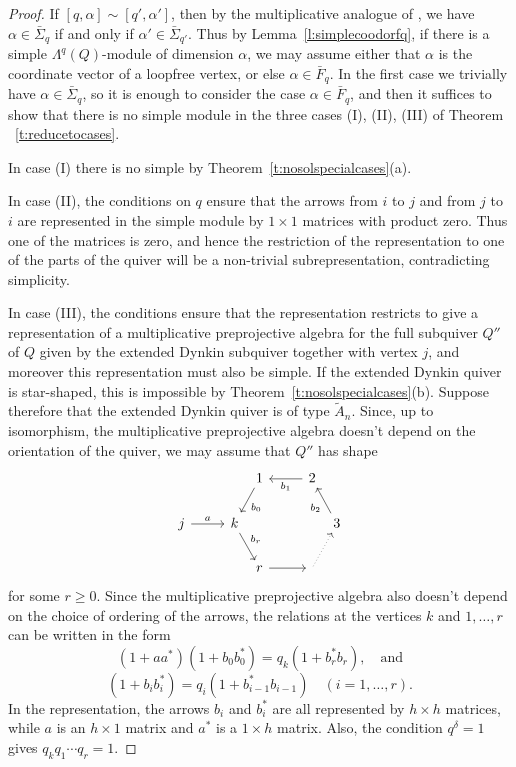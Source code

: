 \documentclass[12pt,a4paper]{amsart}
\theoremstyle{plain}
\begin{document}
\begin{proof}
If $[q,\alpha]\sim[q',\alpha']$, then by the multiplicative analogue of \cite[Lemma 5.2(3)]{CBmm}, we have $\alpha\in\bar\Sigma_q$ if and only if $\alpha'\in\bar\Sigma_{q'}$. Thus by 
Lemma~\ref{l:simplecoodorfq}, if there is a simple $\Lambda^q(Q)$-module of dimension $\alpha$, we may assume either that $\alpha$ is the coordinate vector of a loopfree vertex, or else $\alpha\in\bar F_q$. In the first case we trivially have $\alpha\in\bar\Sigma_q$, so it is enough to consider the case $\alpha\in\bar F_q$, and then it suffices to show that there is no simple module in the three cases (I), (II), (III) of Theorem ~\ref{t:reducetocases}.

In case (I) there is no simple by Theorem~\ref{t:nosolspecialcases}(a).

In case (II), the conditions on $q$ ensure that the arrows from $i$ to $j$ and from $j$ to $i$ 
are represented in the simple module by $1\times 1$ matrices with product zero. Thus one of the matrices is zero, and hence the restriction of the representation to one of the parts of the quiver will be a non-trivial subrepresentation, contradicting simplicity.

In case (III), the conditions ensure that the representation restricts to give a representation of a multiplicative preprojective algebra for the full subquiver $Q''$ of $Q$ given by the extended Dynkin subquiver together with vertex $j$, and moreover this representation must also be simple. If the extended Dynkin quiver is star-shaped, this is impossible by Theorem~\ref{t:nosolspecialcases}(b). Suppose therefore that the extended Dynkin quiver is of type $\tilde{A}_n$. Since, up to isomorphism, the multiplicative preprojective algebra doesn't depend on the orientation of the quiver, we may assume that $Q''$ has shape
\[ \begin{tikzcd}
&&[-20pt] 1 \arrow[dl,"b_0"] & 2 \arrow[l,"b_1"]\\
j \arrow[r,"a"] & k \arrow[dr,"b_r"] &&&[-20pt] 3 \arrow[ul,"b_2"]\\
&& r \arrow[r] & {} \arrow[ur,dotted]
\end{tikzcd}\]
for some $r\ge 0$. Since the multiplicative preprojective algebra also doesn't depend on the choice of ordering of the arrows, the relations at the vertices $k$ and $1,\dots,r$ can be written in the form
\[
(1+aa^*)(1+b_0 b_0^*) = q_k (1+b_r^* b_r), \quad\text{and}
\]
\[
(1+b_i b_i^*) = q_i (1+b_{i-1}^* b_{i-1}) \quad (i=1,\dots,r).
\]
In the representation, the arrows $b_i$ and $b_i^*$ are all represented by $h\times h$ matrices, while $a$ is an $h\times 1$ matrix and $a^*$ is a $1\times h$ matrix. Also, the condition $q^\delta=1$ gives $q_k q_1 \cdots q_r = 1$. 


\end{proof}
\end{document}

